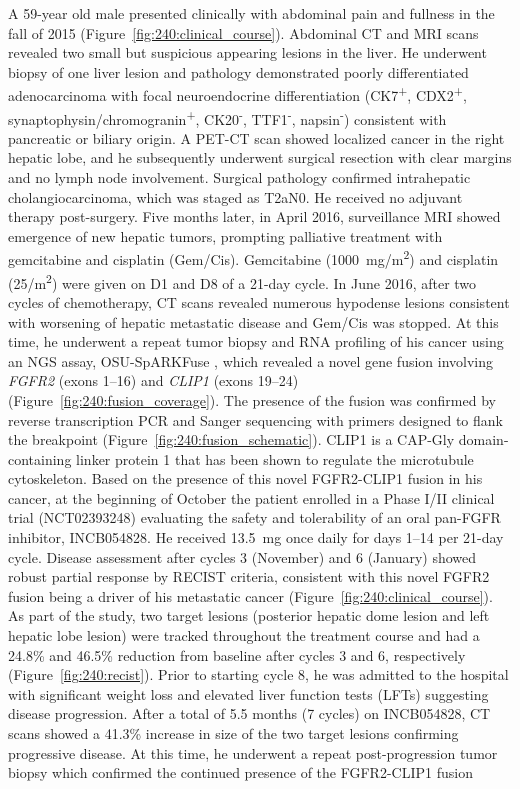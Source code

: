 \begin{figure}[htp]
    \label{fig:240:clinical_desc}
\end{figure}
A 59-year old male presented clinically with abdominal pain and fullness in the fall of 2015 (Figure~\ref{fig:240:clinical_course}). Abdominal CT and MRI scans revealed two small but suspicious appearing lesions in the liver. He underwent biopsy of one liver lesion and pathology demonstrated poorly differentiated adenocarcinoma with focal neuroendocrine differentiation (CK7\textsuperscript{+}, CDX2\textsuperscript{+}, synaptophysin\slash{}chromogranin\textsuperscript{+}, CK20\textsuperscript{-}, TTF1\textsuperscript{-}, napsin\textsuperscript{-}) consistent with pancreatic or biliary origin. A PET-CT scan showed localized cancer in the right hepatic lobe, and he subsequently underwent surgical resection with clear margins and no lymph node involvement. Surgical pathology confirmed intrahepatic cholangiocarcinoma, which was staged as T2aN0. He received no adjuvant therapy post-surgery. Five months later, in April 2016, surveillance MRI showed emergence of new hepatic tumors, prompting palliative treatment with gemcitabine and cisplatin (Gem/Cis). Gemcitabine (1000~mg/m\textsuperscript{2}) and cisplatin (25/m\textsuperscript{2}) were given on D1 and D8 of a 21-day cycle.  In June 2016, after two cycles of chemotherapy, CT scans revealed numerous hypodense lesions consistent with worsening of hepatic metastatic disease and Gem/Cis was stopped.  At this time, he underwent a repeat tumor biopsy and RNA profiling of his cancer using an NGS assay, OSU-SpARKFuse \cite{reeser2017}, which revealed a novel gene fusion involving \textit{FGFR2} (exons 1--16) and \textit{CLIP1} (exons 19--24) (Figure~\ref{fig:240:fusion_coverage}). The presence of the fusion was confirmed by reverse transcription PCR and Sanger sequencing with primers designed to flank the breakpoint (Figure~\ref{fig:240:fusion_schematic}). CLIP1 is a CAP-Gly domain-containing linker protein 1 that has been shown to regulate the microtubule cytoskeleton. Based on the presence of this novel FGFR2-CLIP1 fusion in his cancer, at the beginning of October the patient enrolled in a Phase I/II clinical trial (NCT02393248) evaluating the safety and tolerability of an oral pan-FGFR inhibitor, INCB054828. He received 13.5~mg once daily for days 1--14 per 21-day cycle. Disease assessment after cycles 3 (November) and 6 (January) showed robust partial response by RECIST criteria, consistent with this novel FGFR2 fusion being a driver of his metastatic cancer (Figure~\ref{fig:240:clinical_course}). As part of the study, two target lesions (posterior hepatic dome lesion and left hepatic lobe lesion) were tracked throughout the treatment course and had a 24.8\% and 46.5\% reduction from baseline after cycles 3 and 6, respectively (Figure~\ref{fig:240:recist}). Prior to starting cycle 8, he was admitted to the hospital with significant weight loss and elevated liver function tests (LFTs) suggesting disease progression. After a total of 5.5 months (7 cycles) on INCB054828, CT scans showed a 41.3\% increase in size of the two target lesions confirming progressive disease. At this time, he underwent a repeat post-progression tumor biopsy which confirmed the continued presence of the FGFR2-CLIP1 fusion 